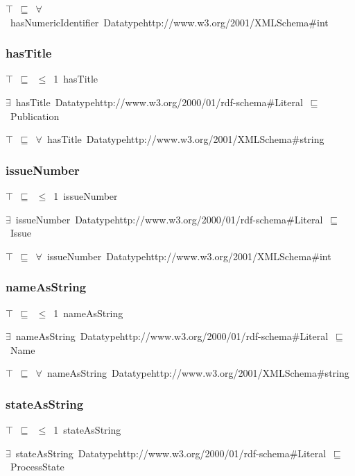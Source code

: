 \documentclass{article}
\begin{document}
\ensuremath{\top}~\ensuremath{\sqsubseteq}~\ensuremath{\forall}~hasNumericIdentifier~Datatypehttp://www.w3.org/2001/XMLSchema#int

\subsubsection*{hasTitle}

\ensuremath{\top}~\ensuremath{\sqsubseteq}~\ensuremath{\leq}~1~hasTitle

\ensuremath{\exists}~hasTitle~Datatypehttp://www.w3.org/2000/01/rdf-schema#Literal~\ensuremath{\sqsubseteq}~Publication

\ensuremath{\top}~\ensuremath{\sqsubseteq}~\ensuremath{\forall}~hasTitle~Datatypehttp://www.w3.org/2001/XMLSchema#string

\subsubsection*{issueNumber}

\ensuremath{\top}~\ensuremath{\sqsubseteq}~\ensuremath{\leq}~1~issueNumber

\ensuremath{\exists}~issueNumber~Datatypehttp://www.w3.org/2000/01/rdf-schema#Literal~\ensuremath{\sqsubseteq}~Issue

\ensuremath{\top}~\ensuremath{\sqsubseteq}~\ensuremath{\forall}~issueNumber~Datatypehttp://www.w3.org/2001/XMLSchema#int

\subsubsection*{nameAsString}

\ensuremath{\top}~\ensuremath{\sqsubseteq}~\ensuremath{\leq}~1~nameAsString

\ensuremath{\exists}~nameAsString~Datatypehttp://www.w3.org/2000/01/rdf-schema#Literal~\ensuremath{\sqsubseteq}~Name

\ensuremath{\top}~\ensuremath{\sqsubseteq}~\ensuremath{\forall}~nameAsString~Datatypehttp://www.w3.org/2001/XMLSchema#string

\subsubsection*{stateAsString}

\ensuremath{\top}~\ensuremath{\sqsubseteq}~\ensuremath{\leq}~1~stateAsString

\ensuremath{\exists}~stateAsString~Datatypehttp://www.w3.org/2000/01/rdf-schema#Literal~\ensuremath{\sqsubseteq}~ProcessState
\end{document}

